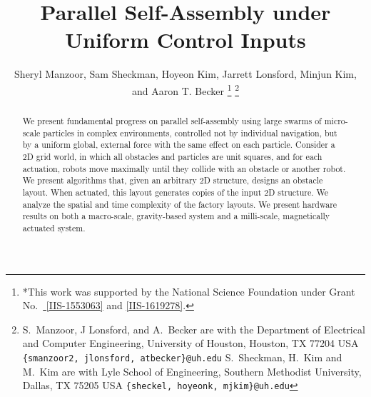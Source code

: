 \documentclass[letterpaper, 10 pt, conference]{ieeeconf}
\begin{document}
\title{\LARGE \bf 
Parallel Self-Assembly under Uniform Control Inputs 
}
\author{Sheryl Manzoor, Sam Sheckman, Hoyeon Kim, Jarrett Lonsford, Minjun Kim, and Aaron T. Becker%
\thanks{*This work was supported by the National Science Foundation under Grant No.\ \href{http://nsf.gov/awardsearch/showAward?AWD_ID=1553063}{ [IIS-1553063]} and \href{http://nsf.gov/awardsearch/showAward?AWD_ID=1619278}{[IIS-1619278]}.}%
\thanks{S.~Manzoor, J Lonsford, and  A.~Becker are with the Department of Electrical and Computer Engineering,  University of Houston, Houston, TX 77204 USA        {\tt\small  \{smanzoor2, jlonsford, atbecker\}@uh.edu}
S.~Sheckman, H.~Kim and M.~Kim are with Lyle School of Engineering,   Southern Methodist University, Dallas, TX 75205 USA        {\tt\small  \{sheckel, hoyeonk, mjkim\}@uh.edu}
}
}
\maketitle


\begin{abstract} 
We present fundamental progress on parallel self-assembly using large swarms of micro-scale particles
in complex environments, controlled not by individual navigation, but by a uniform global, external force with the same effect on each particle.
Consider a 2D grid world, in which all obstacles and particles are unit squares,
and for each actuation, robots move maximally until they collide with an obstacle or another robot. 
We present algorithms that, given an arbitrary 2D structure, designs an obstacle layout.
 When actuated, this layout generates copies of the input 2D structure.
We analyze the spatial and time complexity of the factory layouts. 
We present hardware results on both a macro-scale, gravity-based system and a milli-scale, magnetically actuated system.


\end{abstract}












\newpage
\tableofcontents
\setcounter{tocdepth}{3}
\mbox{}
\end{document}

